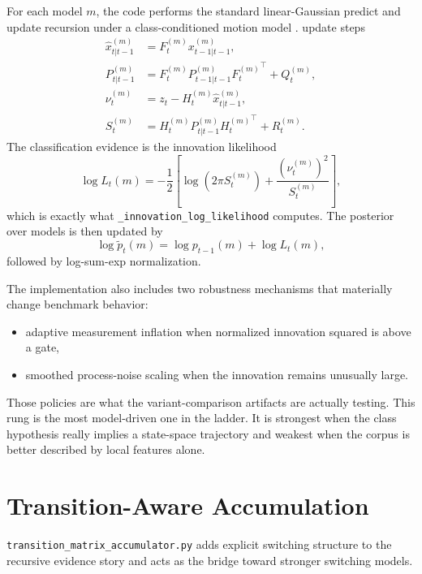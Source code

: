 \documentclass[11pt]{article}
\begin{document}
For each model \(m\), the code performs the standard linear-Gaussian predict and
update recursion under a class-conditioned motion model \cite{kalman1960}.
update steps
\begin{align}
    \hat{x}_{t|t-1}^{(m)} &= F_t^{(m)} x_{t-1|t-1}^{(m)}, \\
    P_{t|t-1}^{(m)} &= F_t^{(m)} P_{t-1|t-1}^{(m)} {F_t^{(m)}}^\top + Q_t^{(m)}, \\
    \nu_t^{(m)} &= z_t - H_t^{(m)} \hat{x}_{t|t-1}^{(m)}, \\
    S_t^{(m)} &= H_t^{(m)} P_{t|t-1}^{(m)} {H_t^{(m)}}^\top + R_t^{(m)}.
\end{align}
The classification evidence is the innovation likelihood
\begin{equation}
    \log L_t(m)
    = -\frac{1}{2}\left[
        \log\!\left(2\pi S_t^{(m)}\right)
        + \frac{(\nu_t^{(m)})^2}{S_t^{(m)}}
    \right],
\end{equation}
which is exactly what \texttt{\_innovation\_log\_likelihood} computes. The
posterior over models is then updated by
\begin{equation}
    \log \tilde{p}_t(m) = \log p_{t-1}(m) + \log L_t(m),
\end{equation}
followed by log-sum-exp normalization.

The implementation also includes two robustness mechanisms that materially
change benchmark behavior:
\begin{itemize}[leftmargin=1.5em]
    \item adaptive measurement inflation when normalized innovation squared is
    above a gate,
    \item smoothed process-noise scaling when the innovation remains unusually
    large.
\end{itemize}
Those policies are what the variant-comparison artifacts are actually testing.
This rung is the most model-driven one in the ladder. It is strongest when the
class hypothesis really implies a state-space trajectory and weakest when the
corpus is better described by local features alone.

\section{Transition-Aware Accumulation}

\texttt{transition\_matrix\_accumulator.py} adds explicit switching structure to
the recursive evidence story and acts as the bridge toward stronger switching
models.
\end{document}
